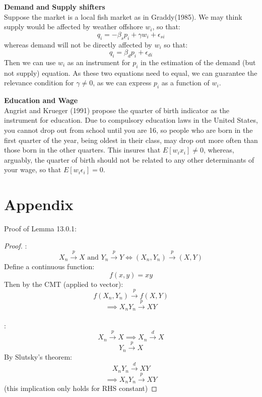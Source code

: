 \documentclass[DIV=14,titlepage=false]{scrreprt}
\begin{document}
\vspace{5mm}
\begin{example} \textbf{Demand and Supply shifters} \\
    Suppose the market is a local fish market as in Graddy(1985).
    We may think supply would be affected by weather offshore \(w_i\), so that:
    \[q_i=-\beta_sp_i+\gamma w_i+\epsilon_{si}\]
    whereas demand will not be directly affected by \(w_i\) so that:
    \[q_i=\beta_dp_i+\epsilon_{di}\]
    Then we can use \(w_i\) as an instrument for \(p_i\) in the estimation of the demand (but not supply) equation.
    As these two equations need to equal, we can guarantee the relevance condition for \(\gamma\neq0\), as we can express \(p_i\) as a function of \(w_i\).
\end{example}
\vspace{1mm}
\begin{example} \textbf{Education and Wage} \\
Angrist and Krueger (1991) propose the
quarter of birth indicator as the instrument for education. Due to compulsory education laws in the United States,
you cannot drop out from school until you are 16, so people who are born in the first quarter of the year, being oldest
in their class, may drop out more often than those born in the other quarters. This insures that \(E[w_ix_i]\neq0\), whereas,
arguably, the quarter of birth should not be related to any other determinants of your wage, so that \(E[w_i\epsilon_i] = 0\).
\end{example}

\section{Appendix}

Proof of Lemma 13.0.1:
\begin{proof}
    \underline{}:
        \[X_n\overset{p}{\to}X\text{ and }Y_n\overset{p}{\to}Y \iff (X_n,Y_n) \overset{p}{\to}(X,Y)\]
    Define a continuous function:
    \[f(x,y)=xy\]
    Then by the CMT (applied to vector):
    \[f(X_n,Y_n)\overset{p}{\to}f(X,Y)\]
    \[\implies X_nY_n\overset{p}{\to}XY\]
    \\
    \underline{}:
    \[X_n\overset{p}{\to}X \implies X_n\overset{d}{\to}X\]
    \[Y_n\overset{p}{\to}X\]
    By Slutsky's theorem:
    \[X_nY_n\overset{d}{\to}XY\]
    \[\implies X_nY_n\overset{p}{\to}XY\]
    (this implication only holds for RHS constant)
    \end{proof}
\end{document}
